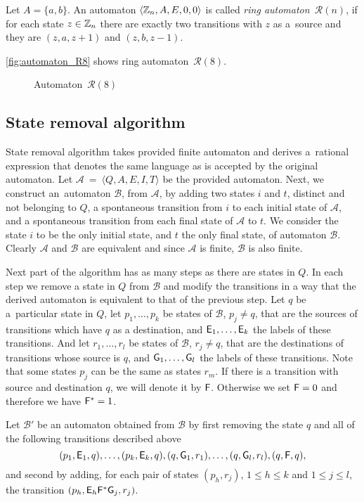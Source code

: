 \begin{defn}
    Let $A = {\{a,b\}}$. An automaton $\langle \mathbb{Z}_n, A, E, 0, 0 \rangle$ is called \emph{ring automaton~${\mathcal{R}(n)}$}, if for each state $z \in \mathbb{Z}_n$ there are exactly two transitions with $z$ as a~source and they are $(z, a, z+1)$ and $(z, b, z-1)$.
\end{defn}

\begin{example}
    \autoref*{fig:automaton_R8} shows ring automaton~${\mathcal{R}(8)}$.

    \begin{figure}[h]
        \centering
        
        \caption{Automaton~${\mathcal{R}(8)}$}\label{fig:automaton_R8}
    \end{figure}
\end{example}

\subsection{State removal algorithm}

State removal algorithm takes provided finite automaton and derives a~rational expression that denotes the same language as is accepted by the original automaton. Let $\mathcal{A}~=~\langle Q, A, E, I, T \rangle$ be the provided automaton. Next, we construct an~automaton $\mathcal{B}$, from $\mathcal{A}$, by adding two states $i$ and $t$, distinct and not belonging to $Q$, a spontaneous transition from $i$ to each initial state of $\mathcal{A}$, and a spontaneous transition from each final state of $\mathcal{A}$ to $t$. We consider the state $i$ to be the only initial state, and $t$ the only final state, of automaton $\mathcal{B}$. Clearly $\mathcal{A}$ and $\mathcal{B}$ are equivalent and since $\mathcal{A}$ is finite, $\mathcal{B}$ is also finite.

Next part of the algorithm has as many steps as there are states in $Q$. In each step we remove a state in $Q$ from $\mathcal{B}$ and modify the transitions in a way that the derived automaton is equivalent to that of the previous step. Let $q$ be a~particular state in $Q$, let $p_1, \dotsc , p_k$ be states of $\mathcal{B}$, $p_j \neq q$, that are the sources of transitions which have $q$ as a destination, and ${\mathsf{E}}_1, \dotsc , {\mathsf{E}}_k$ the labels of these transitions. And let $r_1, \dotsc , r_l$ be states of $\mathcal{B}$, $r_j \neq q$, that are the destinations of transitions whose source is $q$, and ${\mathsf{G}}_1, \dotsc , {\mathsf{G}}_l$ the labels of these transitions. Note that some states $p_j$ can be the same as states $r_m$. If there is a transition with source and destination $q$, we will denote it by ${\mathsf{F}}$. Otherwise we set ${\mathsf{F}} = 0$ and therefore we have ${\mathsf{F}}^* = 1$.

Let $\mathcal{B}'$ be an automaton obtained from $\mathcal{B}$ by first removing the state $q$ and all of the following transitions described above
\[
    (p_1, {\mathsf{E}}_1, q), \dotsc, (p_k, {\mathsf{E}}_k, q), (q, {\mathsf{G}}_1, r_1), \dotsc, (q, {\mathsf{G}}_l, r_l), (q, {\mathsf{F}}, q),
\]
and second by adding, for each pair of states $(p_h, r_j)$, $1 \leq h \leq k$ and $1 \leq j \leq l$, the transition $(p_h, {\mathsf{E}}_h {\mathsf{F}}^* {\mathsf{G}}_j, r_j)$.

